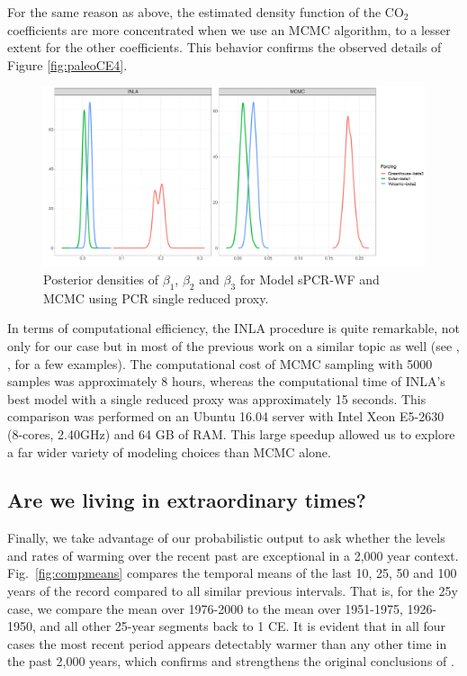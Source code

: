 \documentclass[12pt]{amsart}
\theoremstyle{plain}
\theoremstyle{definition}
\theoremstyle{remark}
\newcommand{\lb}[1]{\color{MidnightBlue}\textbf{[LB: #1]}\normalcolor}
\newcommand{\jeg}[1]{\color{ProcessBlue}\textbf{[JEG: #1]}\normalcolor}
\begin{document}
For the same reason as above, the estimated density
function of the CO$_2$ coefficients are more
concentrated when we use an MCMC algorithm, to a lesser extent for the other 
coefficients. This behavior confirms the observed details of Figure
\ref{fig:paleoCE4}. 

\begin{figure}
  \centering
  \includegraphics[scale=0.3]{PlotBetas}
  \caption{Posterior densities of $\beta_1$, $\beta_2$ and $\beta_3$ for Model
    sPCR-WF and MCMC using PCR single reduced proxy.}
  \label{fig:betas}
\end{figure}

In terms of computational efficiency, the INLA procedure is quite remarkable, not only
for our case but in most of the previous work on a similar topic as well (see \cite{Rue2009},
\cite{Blangiardo2013}, \cite{Ruiz-Cardenas2012} for a few examples). The
computational cost of MCMC sampling with 5000 samples was
approximately 8 hours, whereas the computational time of INLA's best model with
a single reduced proxy was approximately 15 seconds. This comparison
was performed on an Ubuntu 16.04 server with Intel Xeon E5-2630 (8-cores,
2.40GHz) and 64 GB of RAM.  This large speedup allowed us to explore a far wider variety of modeling choices than MCMC alone.


\subsection{Are we living in extraordinary times?}


    Finally, we take advantage of our probabilistic output to ask whether the levels and rates of warming over the recent past are exceptional in a 2,000 year context.  Fig.~\ref{fig:compmeans} compares the temporal means of the last 10, 25, 50 and 100 years of the record compared to all similar previous intervals. That is, for the 25y case, we compare the mean over 1976-2000 to the mean over 1951-1975, 1926-1950, and all other 25-year segments back to 1 CE. It is evident that in all four cases the most recent period appears detectably warmer than any other time in the past 2,000 years, which confirms and strengthens the original conclusions of \cite{MBH99}.  
\end{document}
